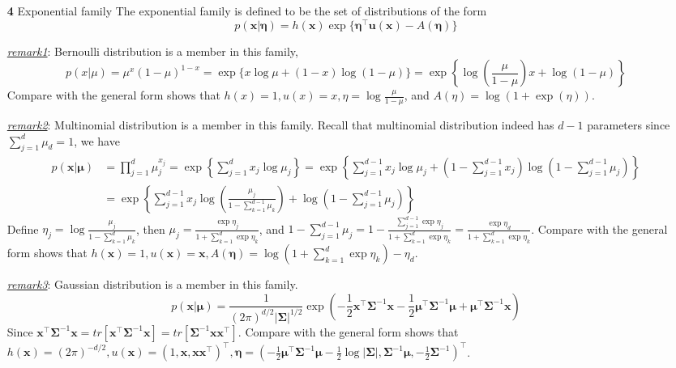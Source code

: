 \documentclass{article}
\begin{document}
\begin{itemize}
	\item [\textbf{4}] Exponential family
	The exponential family is defined to be the set of distributions of the form
	\begin{equation}
	p(\bm{x}|\bm{\eta}) = h(\bm{x}) \exp\{ \bm{\eta}^\top \bm{u}(\bm{x}) - A(\bm{\eta}) \}
	\end{equation}

	\begin{footnotesize}
	\textit{\underline{remark1}}: Bernoulli distribution is a member in this family,
	\begin{equation*}
	p(x|\mu) = \mu^x(1-\mu)^{1-x} = \exp \{ x \log \mu + (1-x) \log (1-\mu) \} = \exp\left\{ \log \left( \frac{\mu}{1-\mu}\right) x + \log(1-\mu)\right\}
	\end{equation*}
	Compare with the general form shows that $h(x)=1,u(x)=x, \eta=\log \frac{\mu}{1-\mu} $, and $A(\eta)=\log (1+\exp(\eta))$.

	\textit{\underline{remark2}}: Multinomial distribution is a member in this family. Recall that multinomial distribution indeed has $d-1$ parameters since $\sum_{j=1}^d \mu_d = 1$, we have
	\begin{equation*}
	\begin{split}
	p(\bm{x}|\bm{\mu}) &= \prod_{j=1}^d \mu_j^{x_j} = \exp\left\{ \sum_{j=1}^d x_j \log \mu_j \right\} = \exp\left\{ \sum_{j=1}^{d-1} x_j \log \mu_j + \left(1-\sum_{j=1}^{d-1} x_j \right) \log \left(1-\sum_{j=1}^{d-1} \mu_j \right) \right\} \\
	&= \exp\left\{ \sum_{j=1}^{d-1} x_j \log \left( \frac{\mu_j}{1-\sum_{k=1}^{d-1} \mu_k} \right) +  \log \left(1-\sum_{j=1}^{d-1} \mu_j \right) \right\}
	\end{split}
	\end{equation*}
	Define $\eta_j =  \log \frac{\mu_j}{1-\sum_{k=1}^d \mu_k}$, then $\mu_j = \frac{\exp\eta_j}{1+\sum_{k=1}^d \exp \eta_k}$, and $1-\sum_{j=1}^{d-1} \mu_j = 1-\frac{\sum_{j=1}^{d-1} \exp \eta_j}{1+\sum_{k=1}^d \exp \eta_k}=\frac{\exp \eta_{d}}{1+\sum_{k=1}^d \exp \eta_k}$. Compare with the general form shows that $h(\bm{x})=1, u(\bm{x})=\bm{x}, A(\bm{\eta})=\log (1+\sum_{k=1}^d \exp \eta_k)-\eta_d$.
	
	\textit{\underline{remark3}}: Gaussian distribution is a member in this family.
	\begin{equation*}
	p(\bm{x}|\bm{\mu}) = \frac{1}{(2\pi)^{d/2} |\bm{\Sigma}|^{1/2}} \exp \left( -\frac{1}{2} \bm{x}^\top \bm{\Sigma}^{-1} \bm{x}  -\frac{1}{2} \bm{\mu}^\top \bm{\Sigma}^{-1} \bm{\mu} + \bm{\mu}^\top \bm{\Sigma}^{-1} \bm{x} \right)
	\end{equation*}
	Since $\bm{x}^\top \bm{\Sigma}^{-1} \bm{x} = tr [\bm{x}^\top \bm{\Sigma}^{-1} \bm{x}] = tr [\bm{\Sigma}^{-1} \bm{x} \bm{x}^\top ]$. Compare with the general form shows that $h(\bm{x})=(2\pi)^{-d/2}, u(\bm{x})=(1, \bm{x}, \bm{x}\bm{x}^\top)^\top, \bm{\eta}=(-\frac{1}{2} \bm{\mu}^\top \bm{\Sigma}^{-1} \bm{\mu}-\frac{1}{2}\log|\bm{\Sigma}|, \bm{\Sigma}^{-1}\bm{\mu}, -\frac{1}{2} \bm{\Sigma}^{-1})^\top$.
	\end{footnotesize}
	

\end{itemize}
\end{document}
